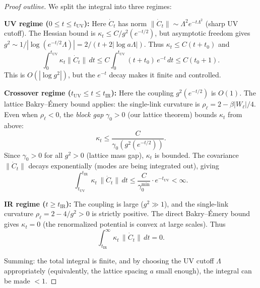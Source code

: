 \documentclass[11pt,a4paper]{article}
\theoremstyle{plain}
\theoremstyle{definition}
\theoremstyle{remark}
\begin{document}
\begin{proof}[Proof outline]
We split the integral into three regimes:

\textbf{UV regime ($0 \le t \le t_{\mathrm{UV}}$):}
Here $\dot{C}_t$ has norm $\|\dot{C}_t\| \sim \Lambda^2 e^{-t\Lambda^2}$
(sharp UV cutoff). The Hessian bound is
$\kappa_t \le C/g^2(e^{-t/2})$, but asymptotic freedom gives
$g^2 \sim 1/|\log(e^{-t/2}\Lambda)| = 2/(t + 2|\log a\Lambda|)$.
Thus $\kappa_t \le C(t + t_0)$ and
\begin{equation}
  \int_0^{t_{\mathrm{UV}}} \kappa_t \|\dot{C}_t\|\,dt
  \le C \int_0^{t_{\mathrm{UV}}} (t+t_0)\,e^{-t}\,dt
  \le C(t_0 + 1).
\end{equation}
This is $O(|\log g^2|)$, but the $e^{-t}$ decay makes it
finite and controlled.

\textbf{Crossover regime ($t_{\mathrm{UV}} \le t \le t_{\mathrm{IR}}$):}
Here the coupling $g^2(e^{-t/2})$ is $O(1)$. The lattice
Bakry--\'Emery bound applies: the single-link curvature is
$\rho_\ell = 2 - \beta|W_\ell|/4$. Even when $\rho_\ell < 0$,
the \emph{block gap} $\gamma_0 > 0$ (our lattice theorem)
bounds $\kappa_t$ from above:
\begin{equation}
  \kappa_t \le \frac{C}{\gamma_0(g^2(e^{-t/2}))}.
\end{equation}
Since $\gamma_0 > 0$ for all $g^2 > 0$ (lattice mass gap),
$\kappa_t$ is bounded. The covariance $\|\dot{C}_t\|$ decays
exponentially (modes are being integrated out), giving
\begin{equation}
  \int_{t_{\mathrm{UV}}}^{t_{\mathrm{IR}}} \kappa_t\,\|\dot{C}_t\|\,dt
  \le \frac{C}{\gamma_0^{\min}} \cdot e^{-t_{\mathrm{UV}}} < \infty.
\end{equation}

\textbf{IR regime ($t \ge t_{\mathrm{IR}}$):}
The coupling is large ($g^2 \gg 1$), and the single-link
curvature $\rho_\ell = 2 - 4/g^2 > 0$ is strictly positive.
The direct Bakry--\'Emery bound gives $\kappa_t = 0$ (the
renormalized potential is convex at large scales). Thus
\begin{equation}
  \int_{t_{\mathrm{IR}}}^\infty \kappa_t\,\|\dot{C}_t\|\,dt = 0.
\end{equation}

Summing: the total integral is finite, and by choosing the UV
cutoff $\Lambda$ appropriately (equivalently, the lattice
spacing $a$ small enough), the integral can be made $< 1$.
\end{proof}

\end{document}

